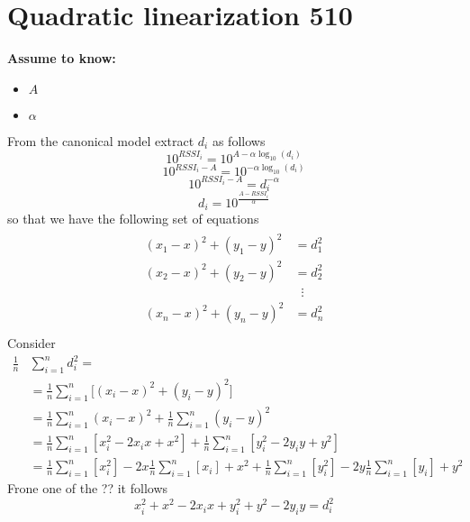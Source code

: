 \documentclass[12pt,twoside]{report}
\begin{document}
\section{Quadratic linearization 510}
  \begin{center}
  \textbf{Assume to know:}
  \begin{itemize}
    \centering
    \item $A$
    \item $\alpha$
  \end{itemize}
  \end{center}
From the canonical model extract $d_i$ as follows
\begin{equation*}
    10^{RSSI_{i}}=10^{A-\alpha\log_{10}(d_i)}
\end{equation*}
\begin{equation*}
    10^{RSSI_{i}-A}=10^{-\alpha\log_{10}(d_i)}
\end{equation*}
\begin{equation*}
     10^{RSSI_{i}-A}=d_i^{-\alpha}
\end{equation*}
\begin{equation}
    d_i=10^{\frac{A-RSSI_{i}}{\alpha}}
\end{equation}
so that we have the following set of equations
\begin{align}
\begin{split} 
(x_1-x)^2+(y_1-y)^2&=d_1^2 \\ 
(x_2-x)^2+(y_2-y)^2&=d_2^2 \\ 
&\;\;\vdots\\
(x_n-x)^2+(y_n-y)^2&=d_n^2 \\
\end{split}
\end{align}
Consider 
\begin{align}
\frac{1}{n}&\sum_{i=1}^nd_i^2=\\
&=\frac{1}{n}\sum_{i=1}^n\big[(x_i-x)^2+(y_i-y)^2\big]\\
&=\frac{1}{n}\sum_{i=1}^n(x_i-x)^2+\frac{1}{n}\sum_{i=1}^n(y_i-y)^2\\
&=\frac{1}{n}\sum_{i=1}^n[x_i^2-2x_ix+x^2] + \frac{1}{n}\sum_{i=1}^n[y_i^2-2y_iy+y^2]\\
&=\frac{1}{n}\sum_{i=1}^n[x_i^2]-2x\frac{1}{n}\sum_{i=1}^n[x_i]+ x^2 + \frac{1}{n}\sum_{i=1}^n[y_i^2]-2y\frac{1}{n}\sum_{i=1}^n[y_i]+ y^2
\end{align}
Frone one of the ?? it follows
\begin{equation}
x_i^2+x^2-2x_ix+y_i^2+y^2-2y_iy=d_i^2      
\end{equation}
\end{document}
